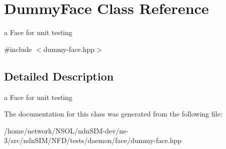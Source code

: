 \hypertarget{classDummyFace}{}\section{Dummy\+Face Class Reference}
\label{classDummyFace}


a Face for unit testing  




{\ttfamily \#include $<$dummy-\/face.\+hpp$>$}



\subsection{Detailed Description}
a Face for unit testing 

The documentation for this class was generated from the following file\+:\begin{DoxyCompactItemize}
\item 
/home/network/\+N\+S\+O\+L/ndn\+S\+I\+M-\/dev/ns-\/3/src/ndn\+S\+I\+M/\+N\+F\+D/tests/daemon/face/dummy-\/face.\+hpp\end{DoxyCompactItemize}
